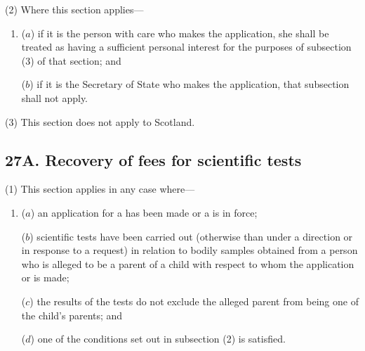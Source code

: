 \documentclass[12pt,a4paper]{article}
\begin{document}
(2) Where this section applies---
\begin{enumerate}\item[]
($a$) if it is the person with care who makes the application, she shall be treated as having a sufficient personal interest for the purposes of subsection (3) of that section; and

($b$) if it is the Secretary of State who makes the application, that subsection shall not apply.
\end{enumerate}

(3) This section does not apply to Scotland.


\subsection{27A. Recovery of fees for scientific tests}

(1) This section applies in any case where---
\begin{enumerate}\item[]
($a$) an application for a  has been made or a  is in force;

($b$)
scientific tests have been carried out (otherwise than under a direction or in response to a request) in relation to bodily samples obtained from a person who is alleged to be a parent of a child with respect to whom the application or  is made;

($c$)
the results of the tests do not exclude the alleged parent from being one of the child’s parents; and

($d$)
one of the conditions set out in subsection (2) is satisfied.
\end{enumerate}
\end{document}
